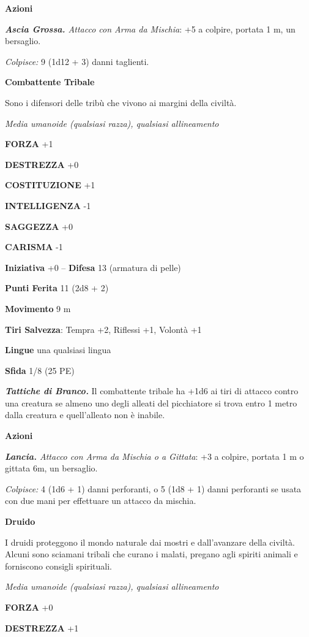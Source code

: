 \begin{multicols}{2}
\textbf{Azioni}

\emph{\textbf{Ascia Grossa.} Attacco con Arma da Mischia}: +5 a colpire, portata 1 m, un bersaglio.

\emph{Colpisce:} 9 (1d12 + 3) danni taglienti.

\textbf{Combattente Tribale}

Sono i difensori delle tribù che vivono ai margini della civiltà.

\emph{Media umanoide (qualsiasi razza), qualsiasi allineamento}

\textbf{FORZA} +1

\textbf{DESTREZZA} +0

\textbf{COSTITUZIONE} +1

\textbf{INTELLIGENZA} -1

\textbf{SAGGEZZA} +0

\textbf{CARISMA} -1

\textbf{Iniziativa} +0 -- \textbf{Difesa} 13 (armatura di pelle)

\textbf{Punti Ferita} 11 (2d8 + 2)

\textbf{Movimento} 9 m

\textbf{Tiri Salvezza}: Tempra +2, Riflessi +1, Volontà +1 

\textbf{Lingue} una qualsiasi lingua

\textbf{Sfida} 1/8 (25 PE)

\emph{\textbf{Tattiche di Branco.}} Il combattente tribale ha +1d6 ai tiri di attacco contro una creatura se almeno uno degli alleati del picchiatore si trova entro 1 metro dalla creatura e quell'alleato non è inabile.

\textbf{Azioni}

\emph{\textbf{Lancia.} Attacco con Arma da Mischia o a Gittata}: +3 a colpire, portata 1 m o gittata 6m, un bersaglio.

\emph{Colpisce:} 4 (1d6 + 1) danni perforanti, o 5 (1d8 + 1) danni perforanti se usata con due mani per effettuare un attacco da mischia.

\medskip\textbf{Druido}

I druidi proteggono il mondo naturale dai mostri e dall'avanzare della civiltà. Alcuni sono sciamani tribali che curano i malati, pregano agli spiriti animali e forniscono consigli spirituali.

\emph{Media umanoide (qualsiasi razza), qualsiasi allineamento}

\textbf{FORZA} +0

\textbf{DESTREZZA} +1


\end{multicols}
